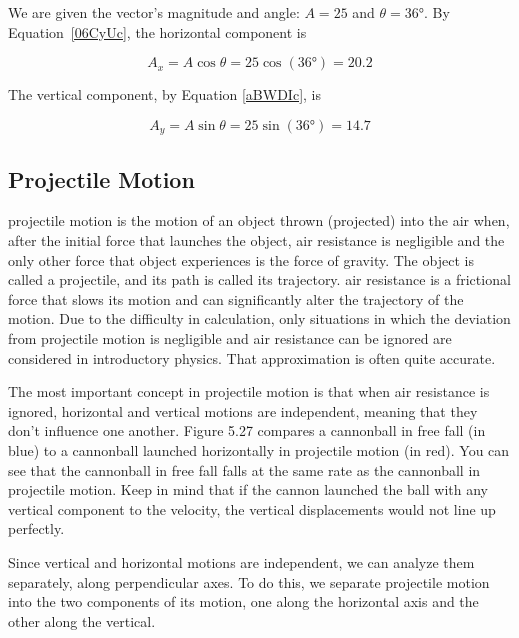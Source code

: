 \documentclass[dvipsnames]{article}
\numberwithin{equation}{section}
\numberwithin{figure}{section}
\begin{document}
\Solution We are given the vector's magnitude and angle: $A = 25$ and $\theta=\ang{36}$. By Equation~\eqref{06CyUc}, the horizontal component is

\begin{equation*}
    A_x = A \cos{\theta} = 25 \cos{(\ang{36})} = 20.2
\end{equation*}

The vertical component, by Equation \eqref{aBWDIc}, is

\begin{equation*}
    A_y = A \sin{\theta} = 25 \sin{(\ang{36})} = 14.7
\end{equation*}

\solutionEnd

\subsection{Projectile Motion} \label{tMF7JY}

\Gls{projectile motion} is the motion of an object thrown (projected) into the air when, after the initial force that launches the object, air resistance is negligible and the only other force that object experiences is the force of gravity. The object is called a \gls{projectile}, and its path is called its \gls{trajectory}. \Gls{air resistance} is a frictional force that slows its motion and can significantly alter the trajectory of the motion. Due to the difficulty in calculation, only situations in which the deviation from projectile motion is negligible and air resistance can be ignored are considered in introductory physics. That approximation is often quite accurate.

\vspace{1em}

The most important concept in projectile motion is that when air resistance is ignored, horizontal and vertical motions are independent, meaning that they don't influence one another. Figure 5.27 compares a cannonball in free fall (in blue) to a cannonball launched horizontally in projectile motion (in red). You can see that the cannonball in free fall falls at the same rate as the cannonball in projectile motion. Keep in mind that if the cannon launched the ball with any vertical component to the velocity, the vertical displacements would not line up perfectly.

\vspace{1em}

Since vertical and horizontal motions are independent, we can analyze them separately, along perpendicular axes. To do this, we separate projectile motion into the two components of its motion, one along the horizontal axis and the other along the vertical.
\end{document}
